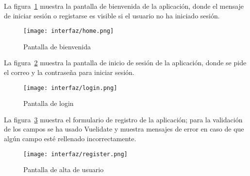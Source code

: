 La figura~\ref{img:prototipo-welcome} muestra la pantalla de bienvenida de la aplicación, donde el mensaje de iniciar sesión o registarse es visible si el usuario no ha iniciado sesión.

\begin{figure}[H]
    \centering
    \texttt{[image: interfaz/home.png]}
    \caption{Pantalla de bienvenida}
    \label{img:prototipo-welcome}
\end{figure}

La figura~\ref{img:prototipo-login} muestra la pantalla de inicio de sesión de la aplicación, donde se pide el correo y la contraseña para iniciar sesión.


\begin{figure}[H]
    \centering
    \texttt{[image: interfaz/login.png]}
    \caption{Pantalla de login}
    \label{img:prototipo-login}
\end{figure}
La figura~\ref{img:prototipo-signup} muestra el formulario de registro de la aplicación; para la validación de los campos se ha usado Vuelidate y muestra mensajes de error en caso de que algún campo esté rellenado incorrectamente.


\begin{figure}[H]
    \centering
    \texttt{[image: interfaz/register.png]}
    \caption{Pantalla de alta de usuario}
    \label{img:prototipo-signup}
\end{figure}





